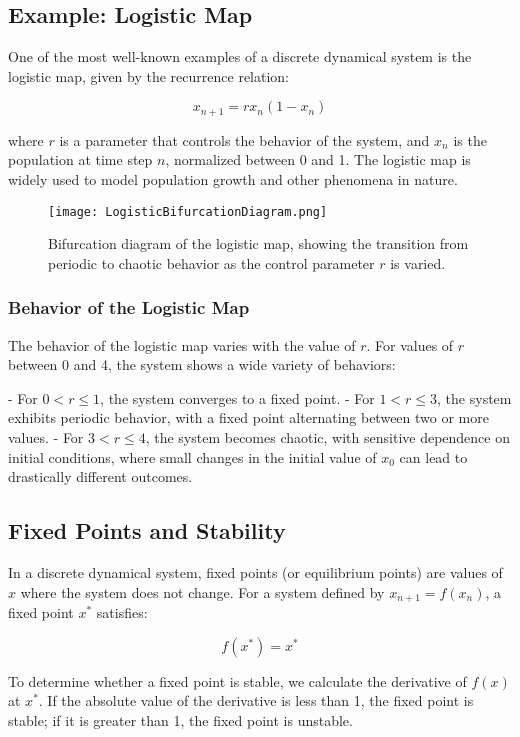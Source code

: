 \documentclass{amsbook}
\begin{document}
\subsection{Example: Logistic Map}
One of the most well-known examples of a discrete dynamical system is the logistic map, given by the recurrence relation:

\[
x_{n+1} = r x_n (1 - x_n)
\]

where \( r \) is a parameter that controls the behavior of the system, and \( x_n \) is the population at time step \( n \), normalized between 0 and 1. The logistic map is widely used to model population growth and other phenomena in nature.

\begin{figure}[H]
    \centering
    \texttt{[image: LogisticBifurcationDiagram.png]}
    \caption{Bifurcation diagram of the logistic map, showing the transition from periodic to chaotic behavior as the control parameter $r$ is varied.}
    \label{fig:LogisticBifurcationDiagram}
\end{figure}

\subsubsection{Behavior of the Logistic Map}
The behavior of the logistic map varies with the value of \( r \). For values of \( r \) between 0 and 4, the system shows a wide variety of behaviors:

- For \( 0 < r \leq 1 \), the system converges to a fixed point.
- For \( 1 < r \leq 3 \), the system exhibits periodic behavior, with a fixed point alternating between two or more values.
- For \( 3 < r \leq 4 \), the system becomes chaotic, with sensitive dependence on initial conditions, where small changes in the initial value of \( x_0 \) can lead to drastically different outcomes.

\subsection{Fixed Points and Stability}
In a discrete dynamical system, fixed points (or equilibrium points) are values of \( x \) where the system does not change. For a system defined by \( x_{n+1} = f(x_n) \), a fixed point \( x^* \) satisfies:

\[
f(x^*) = x^*
\]

To determine whether a fixed point is stable, we calculate the derivative of \( f(x) \) at \( x^* \). If the absolute value of the derivative is less than 1, the fixed point is stable; if it is greater than 1, the fixed point is unstable.
\end{document}

